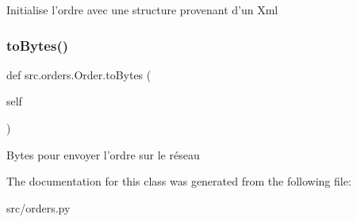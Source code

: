 \begin{DoxyVerb}Initialise l'ordre avec une structure provenant d'un Xml \end{DoxyVerb}
 \hypertarget{classsrc_1_1orders_1_1_order_a294bf5c8b77a05db611e3a4001a71494}{}\label{classsrc_1_1orders_1_1_order_a294bf5c8b77a05db611e3a4001a71494} 
\subsubsection{\texorpdfstring{to\+Bytes()}{toBytes()}}
{\footnotesize\ttfamily def src.\+orders.\+Order.\+to\+Bytes (\begin{DoxyParamCaption}\item[{}]{self }\end{DoxyParamCaption})}

\begin{DoxyVerb}Bytes pour envoyer l'ordre sur le réseau \end{DoxyVerb}
 

The documentation for this class was generated from the following file\+:\begin{DoxyCompactItemize}
\item 
src/orders.\+py\end{DoxyCompactItemize}
